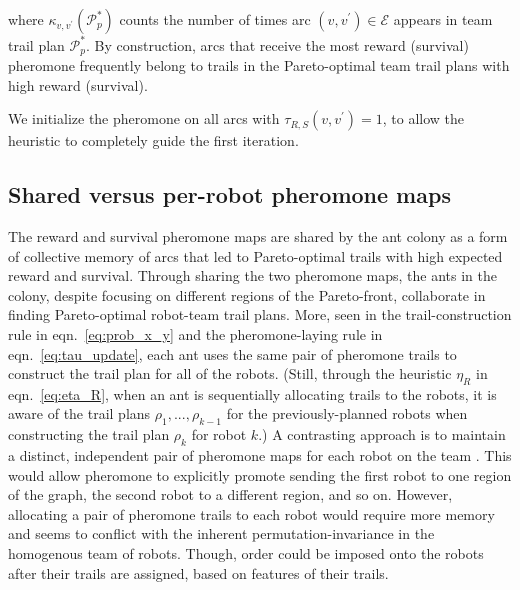 \documentclass[fleqn,10pt,lineno]{wlpeerj}
\begin{document}
where $\kappa_{v, v^\prime}(\mathcal{P}^*_p)$ counts the number of times arc $(v, v^\prime) \in \mathcal{E}$ appears in team trail plan $\mathcal{P}^*_p$.
By construction, arcs that receive the most reward (survival) pheromone frequently belong to trails in the Pareto-optimal team trail plans with high reward (survival).

We initialize the pheromone on all arcs with $\tau_{R,S}(v, v^\prime)=1$, to allow the heuristic to completely guide the first iteration. 

\subsection{Shared versus per-robot pheromone maps}
The reward and survival pheromone maps are shared by the ant colony as a form of collective memory of arcs that led to Pareto-optimal trails with high expected reward and survival. Through sharing the two pheromone maps, the ants in the colony, despite focusing on different regions of the Pareto-front, collaborate in finding Pareto-optimal robot-team trail plans.
More, seen in the trail-construction rule in eqn.~\ref{eq:prob_x_y} and the pheromone-laying rule in eqn.~\ref{eq:tau_update}, each ant uses the same pair of pheromone trails to construct the trail plan for all of the robots. (Still, through the heuristic $\eta_R$ in eqn.~\ref{eq:eta_R}, when an ant is sequentially allocating trails to the robots, it is aware of the trail plans $\rho_1, ..., \rho_{k-1}$ for the previously-planned robots when constructing the trail plan $\rho_k$ for robot $k$.)
A contrasting approach is to maintain a distinct, independent pair of pheromone maps for each robot on the team \cite{bell2004ant}. 
This would allow pheromone to explicitly promote sending the first robot to one region of the graph, the second robot to a different region, and so on. However, allocating a pair of pheromone trails to each robot would require more memory and seems to conflict with the inherent permutation-invariance in the homogenous team of robots. Though, order could be imposed onto the robots after their trails are assigned, based on features of their trails.
\end{document}
